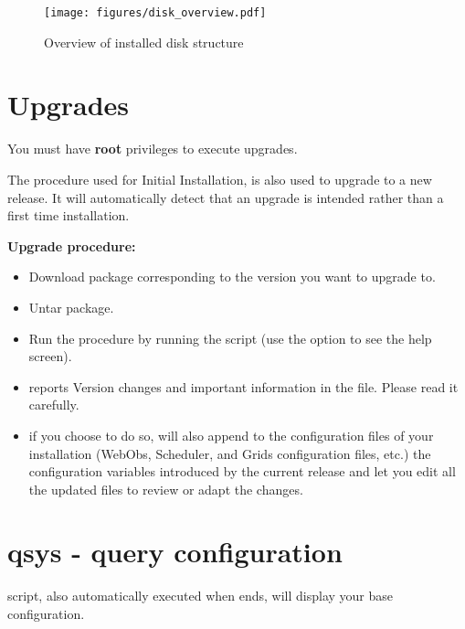 \begin{figure}[!h]
	\centering
	\texttt{[image: figures/disk\_overview.pdf]}
	\caption{Overview of \webobs installed disk structure}
\end{figure}

\section{Upgrades}

You must have \textbf{root} privileges to execute \webobs upgrades.

The  procedure used for Initial Installation, is also used to upgrade \webobs to a new release.
It will automatically detect that an upgrade is intended rather than a first time installation.

\textbf{Upgrade procedure:}

\begin{itemize}
\item   Download \webobs package corresponding to the version you want to upgrade to.
\item   Untar \webobs package.
\item   Run the  procedure by running the script  (use the  option to see the help screen).
\item   {} reports Version changes and important information in the
 file. Please read it carefully.
\item   if you choose to do so,  will also append to the
	configuration files of your installation (WebObs, Scheduler, and Grids
	configuration files, etc.) the configuration variables introduced by the
	current release and let you edit all the updated files to review or adapt
	the changes.
\end{itemize}

\section{qsys - query configuration}

 script, also automatically executed when  ends, will
display your base \webobs configuration.

